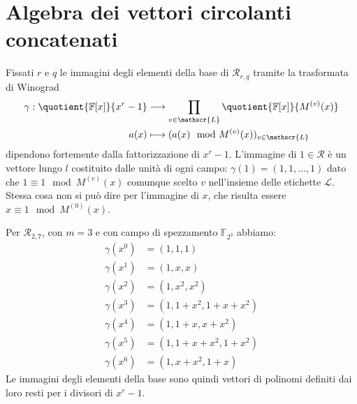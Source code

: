\section{Algebra dei vettori circolanti concatenati}
Fissati $r$ e $q$ le immagini degli elementi della base di $\mathcal{R}_{r,q}$ tramite la trasformata di Winograd
\begin{align*}
  \gamma :  \quotient{\mathbb{F} \lbrack x \rbrack  }{x^{r} - 1}
      & \longrightarrow
      \prod_{v\in \mathscr{L}} \quotient{\mathbb{F} \lbrack x \rbrack  }{M^{(v)}(x)}   \\
      a(x) &\longmapsto  ( a(x)\mod{M^{(v)}(x)})_{v\in \mathscr{L}}
  \end{align*}
dipendono fortemente dalla fattorizzazione di $x^r-1$. L'immagine di $1 \in \mathcal{R}$ è un vettore lungo $l$ costituito dalle unità di ogni campo: $\gamma(1) = (1,1,\dots ,1)$ dato che $1 \equiv 1 \mod M^{(v)}(x)$ comunque scelto $v$ nell'insieme delle etichette $\mathscr{L}$. Stessa cosa non si può dire per l'immagine di $x$, che risulta essere $x \equiv 1 \mod M^{(0)}(x)$.
\begin{esempio} \label{ese:primoSuTrasf}
   Per $\mathcal{R}_{2,7}$, con $m = 3$ e con campo di spezzamento $\mathbb{F}_{2^3}$ abbiamo:
\begin{align*}
  \gamma(x^0) &= (1,1,1)  \\
  \gamma(x^1) &= (1,x,x) \\
  \gamma(x^2) &= (1,x^2,x^2)  \\
  \gamma(x^3) &= (1,1+x^2,1+x+x^2)  \\
  \gamma(x^4) &= (1,1+x,x+x^2)  \\
  \gamma(x^5) &= (1,1+x+x^2,1+x^2)  \\
  \gamma(x^6) &= (1,x+x^2,1+x)
\end{align*}
Le immagini degli elementi della base sono quindi vettori di polinomi definiti dai loro resti per i divisori di $x^r-1$.
\end{esempio}

